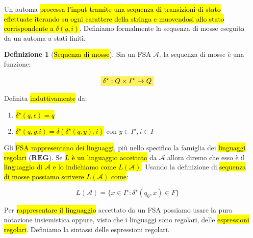 \documentclass[a4paper,11pt,oneside]{article}
\theoremstyle{plain}
\theoremstyle{definition}
\newtheorem{defn}{Definizione}[section]
\theoremstyle{remark}
\newcommand{\mhl}[1]{\colorbox{hlcolor}{$\displaystyle #1$}}
\begin{document}
Un automa \hl{processa l'input tramite una sequenza di transizioni di stato
effettuate iterando su ogni carattere della stringa e muovendosi allo stato
corrispondente a $\delta(q, i)$}. Definiamo formalmente la sequenza di mosse
eseguita da un automa a stati finiti.

\begin{defn}[\hl{Sequenza di mosse}]\label{def:fsa-seq-mosse}
  Sia un FSA $\mathcal{A}$, la sequenza di mosse è una funzione:

  \begin{equation}
    \mhl{ \delta^\star: Q \times I^\star \to Q }
  \end{equation}

  Definita \hl{induttivamente} da:

  \begin{enumerate}
    \item \hl{$\delta^\star(q, \epsilon) = q$}
    \item \hl{$\delta^\star(q, y.i) = \delta(\delta^\star(q,y), i)$} con
      $y \in I^\star, i \in I$
  \end{enumerate}
\end{defn}

Gli \hl{FSA rappresentano dei linguaggi}, più nello specifico la famiglia dei
\hl{linguaggi regolari} ($\mathbf{REG}$). Se \hl{$L$ è un linguaggio accettato}
da $\mathcal{A}$ allora diremo che esso è il \hl{linguaggio di $\mathcal{A}$ e
lo indichiamo come $L(\mathcal{A})$}. Usando la definizione di \hl{sequenza di
mosse possiamo scrivere $L(\mathcal{A})$ come}:

\begin{equation}
  L(\mathcal{A}) = \{ x \in I^\star : \delta^\star(q_0, x) \in F \}
\end{equation}

Per \hl{rappresentare il linguaggio} accettato da un FSA possiamo usare la pura
notazione insiemistica oppure, visto che i linguaggi sono regolari, delle
\hl{espressioni regolari}. Definiamo la sintassi delle espressioni regolari.
\end{document}
